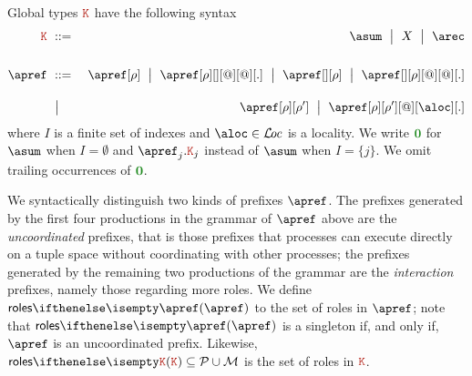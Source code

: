 Global types $\aK$ have the following syntax
\begin{eqnarray*}
  \aK & \bnfdef & \asum \bnfmid
                  X \bnfmid
                  \arec
  \\[1.5em]
  \apref & \bnfdef & \apref[\arole] \bnfmid
                     \apref[\arole][{}][@][@][.] \bnfmid
                     \apref[{}][\arole] \bnfmid
                     \apref[{}][\arole][@][@][.]
  \\[1em]
        & \bnfmid & \apref[\arole][\arole'] \bnfmid
                    \apref[\arole][\arole'][@][\aloc][.]
\end{eqnarray*}
where $I$ is a finite set of indexes and $\aloc \in \locset$ is a
locality.
%
We write $\nil$ for $\asum$ when $I = \emptyset$ and
$\apref_j.\aK_j$ instead of $\asum$ when $I = \{j\}$.
%
We omit trailing occurrences of $\nil$.

We syntactically distinguish two kinds of prefixes $\apref$.
%
The prefixes generated by the first four productions in the grammar of
$\apref$ above are the \emph{uncoordinated} prefixes, that is those
prefixes that processes can execute directly on a tuple space without
coordinating with other processes; the prefixes generated by the
remaining two productions of the grammar are the \emph{interaction}
prefixes, namely those regarding more roles.  
%
We define $\roles \apref$ to the set of roles in $\apref$; note that
$\roles \apref$ is a singleton if, and only if, $\apref$ is an
uncoordinated prefix.
%
Likewise, $\roles \aK \subseteq \participants \cup \multiroles$ is the
set of roles in $\aK$.


